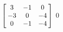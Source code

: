 {$\left[\hskip -3pt \begin{array}{ccc} 3&-1&0\\  -3&0&-4
\\  0&-1&-4\end{array}\hskip -3pt \right]$} 
{$0$}

  

 

